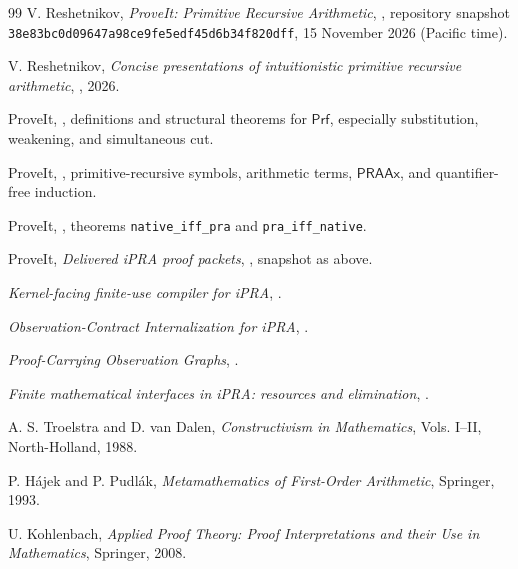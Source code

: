 \documentclass[10pt]{article}
\newcommand{\Prf}{\ensuremath{\mathsf{Prf}}}
\newcommand{\PRAAx}{\ensuremath{\mathsf{PRAAx}}}
\begin{document}
\begin{thebibliography}{99}
V. Reshetnikov, \emph{ProveIt: Primitive Recursive Arithmetic},
, repository snapshot
\texttt{38e83bc0d09647a98ce9fe5edf45d6b34f820dff}, 15 November 2026 (Pacific time).

V. Reshetnikov, \emph{Concise presentations of intuitionistic primitive recursive arithmetic},
, 2026.

ProveIt, , definitions and structural theorems for
\(\Prf\), especially substitution, weakening, and simultaneous cut.

ProveIt, , primitive-recursive symbols, arithmetic terms,
\(\PRAAx\), and quantifier-free induction.

ProveIt, , theorems
\texttt{native\_iff\_pra} and \texttt{pra\_iff\_native}.

ProveIt, \emph{Delivered iPRA proof packets},
, snapshot as above.

\emph{Kernel-facing finite-use compiler for iPRA},
.

\emph{Observation-Contract Internalization for iPRA},
.

\emph{Proof-Carrying Observation Graphs},
.

\emph{Finite mathematical interfaces in iPRA: resources and elimination},
.

A. S. Troelstra and D. van Dalen, \emph{Constructivism in Mathematics}, Vols. I--II,
North-Holland, 1988.

P. H\'ajek and P. Pudl\'ak, \emph{Metamathematics of First-Order Arithmetic},
Springer, 1993.

U. Kohlenbach, \emph{Applied Proof Theory: Proof Interpretations and their Use in Mathematics},
Springer, 2008.
\end{thebibliography}
\end{document}
